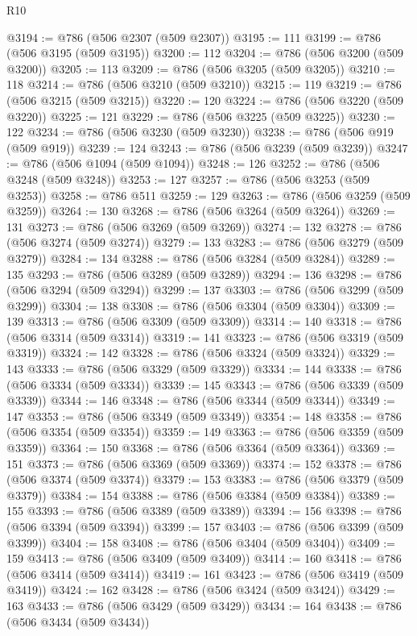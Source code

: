 \begin{lexlean}{R10}
\begin{coremodule}
@3194 := @786 (@506 @2307 (@509 @2307))
@3195 := 111
@3199 := @786 (@506 @3195 (@509 @3195))
@3200 := 112
@3204 := @786 (@506 @3200 (@509 @3200))
@3205 := 113
@3209 := @786 (@506 @3205 (@509 @3205))
@3210 := 118
@3214 := @786 (@506 @3210 (@509 @3210))
@3215 := 119
@3219 := @786 (@506 @3215 (@509 @3215))
@3220 := 120
@3224 := @786 (@506 @3220 (@509 @3220))
@3225 := 121
@3229 := @786 (@506 @3225 (@509 @3225))
@3230 := 122
@3234 := @786 (@506 @3230 (@509 @3230))
@3238 := @786 (@506 @919 (@509 @919))
@3239 := 124
@3243 := @786 (@506 @3239 (@509 @3239))
@3247 := @786 (@506 @1094 (@509 @1094))
@3248 := 126
@3252 := @786 (@506 @3248 (@509 @3248))
@3253 := 127
@3257 := @786 (@506 @3253 (@509 @3253))
@3258 := @786 @511
@3259 := 129
@3263 := @786 (@506 @3259 (@509 @3259))
@3264 := 130
@3268 := @786 (@506 @3264 (@509 @3264))
@3269 := 131
@3273 := @786 (@506 @3269 (@509 @3269))
@3274 := 132
@3278 := @786 (@506 @3274 (@509 @3274))
@3279 := 133
@3283 := @786 (@506 @3279 (@509 @3279))
@3284 := 134
@3288 := @786 (@506 @3284 (@509 @3284))
@3289 := 135
@3293 := @786 (@506 @3289 (@509 @3289))
@3294 := 136
@3298 := @786 (@506 @3294 (@509 @3294))
@3299 := 137
@3303 := @786 (@506 @3299 (@509 @3299))
@3304 := 138
@3308 := @786 (@506 @3304 (@509 @3304))
@3309 := 139
@3313 := @786 (@506 @3309 (@509 @3309))
@3314 := 140
@3318 := @786 (@506 @3314 (@509 @3314))
@3319 := 141
@3323 := @786 (@506 @3319 (@509 @3319))
@3324 := 142
@3328 := @786 (@506 @3324 (@509 @3324))
@3329 := 143
@3333 := @786 (@506 @3329 (@509 @3329))
@3334 := 144
@3338 := @786 (@506 @3334 (@509 @3334))
@3339 := 145
@3343 := @786 (@506 @3339 (@509 @3339))
@3344 := 146
@3348 := @786 (@506 @3344 (@509 @3344))
@3349 := 147
@3353 := @786 (@506 @3349 (@509 @3349))
@3354 := 148
@3358 := @786 (@506 @3354 (@509 @3354))
@3359 := 149
@3363 := @786 (@506 @3359 (@509 @3359))
@3364 := 150
@3368 := @786 (@506 @3364 (@509 @3364))
@3369 := 151
@3373 := @786 (@506 @3369 (@509 @3369))
@3374 := 152
@3378 := @786 (@506 @3374 (@509 @3374))
@3379 := 153
@3383 := @786 (@506 @3379 (@509 @3379))
@3384 := 154
@3388 := @786 (@506 @3384 (@509 @3384))
@3389 := 155
@3393 := @786 (@506 @3389 (@509 @3389))
@3394 := 156
@3398 := @786 (@506 @3394 (@509 @3394))
@3399 := 157
@3403 := @786 (@506 @3399 (@509 @3399))
@3404 := 158
@3408 := @786 (@506 @3404 (@509 @3404))
@3409 := 159
@3413 := @786 (@506 @3409 (@509 @3409))
@3414 := 160
@3418 := @786 (@506 @3414 (@509 @3414))
@3419 := 161
@3423 := @786 (@506 @3419 (@509 @3419))
@3424 := 162
@3428 := @786 (@506 @3424 (@509 @3424))
@3429 := 163
@3433 := @786 (@506 @3429 (@509 @3429))
@3434 := 164
@3438 := @786 (@506 @3434 (@509 @3434))

\end{coremodule}
\end{lexlean}
